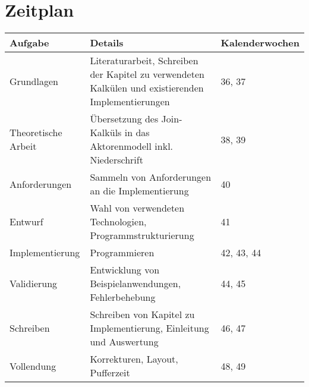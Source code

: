 \documentclass[12pt]{article}
\begin{document}
\section*{Zeitplan}

\begin{tabular}{| p{3cm} | p{7cm} | p{3cm} |}
  \hline
    Aufgabe &
    Details &
    Kalenderwochen \\
  \hline
    Grundlagen &
    Literaturarbeit, Schreiben der Kapitel zu verwendeten Kalkülen und existierenden Implementierungen &
    36, 37 \\
  \hline
    Theoretische \newline Arbeit &
    Übersetzung des Join-Kalküls in das Aktorenmodell inkl. Niederschrift &
    38, 39 \\
  \hline
    Anforderungen &
    Sammeln von Anforderungen an die Implementierung &
    40 \\
  \hline
    Entwurf &
    Wahl von verwendeten Technologien, Programmstrukturierung &
    41 \\
  \hline
    Implementierung &
    Programmieren &
    42, 43, 44 \\
  \hline
    Validierung &
    Entwicklung von Beispiel\-anwendungen, Fehlerbehebung &
    44, 45 \\
  \hline
    Schreiben &
    Schreiben von Kapitel zu Implementierung, Einleitung und Auswertung &
    46, 47 \\
  \hline
    Vollendung &
    Korrekturen, Layout, Pufferzeit &
    48, 49 \\
  \hline
\end{tabular}
\end{document}
